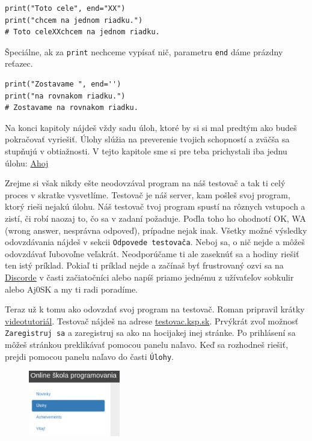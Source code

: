 \begin{lstlisting}
print("Toto cele", end="XX")
print("chcem na jednom riadku.")
# Toto celeXXchcem na jednom riadku.
\end{lstlisting}

Špeciálne, ak za \texttt{print} nechceme vypísať nič, parametru \texttt{end} dáme prázdny reťazec.
\begin{lstlisting}
print("Zostavame ", end='')
print("na rovnakom riadku.")
# Zostavame na rovnakom riadku.
\end{lstlisting}


Na konci kapitoly nájdeš vždy sadu úloh, ktoré by si si mal predtým ako budeš pokračovať vyriešiť. Úlohy slúžia na preverenie tvojich schopností a zväčša sa stupňujú v obtiažnosti. V tejto kapitole sme si pre teba prichystali iba jednu úlohu: \href{https://testovac.ksp.sk/tasks/ls-uvod-ahoj/}{Ahoj}

Zrejme si však nikdy ešte neodovzával program na náš testovač a tak ti celý proces v skratke vysvetlíme. Testovač je náš server, kam pošleš svoj program, ktorý rieši nejakú úlohu. Náš testovač tvoj program spustí na rôznych vstupoch a zistí, či robí naozaj to, čo sa v zadaní požaduje. Poďla toho ho ohodnotí OK, WA (wrong answer, nesprávna odpoveď), prípadne nejak inak. Všetky možné výsledky odovzdávania nájdeš v sekcii \texttt{Odpovede testovača}. Neboj sa, o nič nejde a môžeš odovzdávať ľubovoľne veľakrát. Neodporúčame ti ale zaseknúť sa a hodiny riešiť ten istý príklad. Pokiaľ ti príklad nejde a začínaš byť frustrovaný ozvi sa na \href{https://discord.gg/QKgNmW9}{Discorde} v časti začiatočníci alebo napíš priamo jednému z užívaťeľov sobkulir alebo Aj0SK a my ti radi poradíme.

Teraz už k tomu ako odovzdať svoj program na testovač. Roman pripravil krátky \href{https://www.youtube.com/watch?v=RV5uoLwQDsg}{videotutoriál}. Testovač nájdeš na adrese \href{https://testovac.ksp.sk/}{testovac.ksp.sk}. Prvýkrát zvoľ možnosť \texttt{Zaregistruj sa} a zaregistruj sa ako na hocijakej inej stránke. Po prihlásení sa môžeš stránkou preklikávať pomocou panelu naľavo. Keď sa rozhodneš riešiť, prejdi pomocou panelu naľavo do časti \texttt{Úlohy}.

\begin{figure}[h]
\includegraphics[width=4cm]{lavypanel}
\centering
\end{figure}

